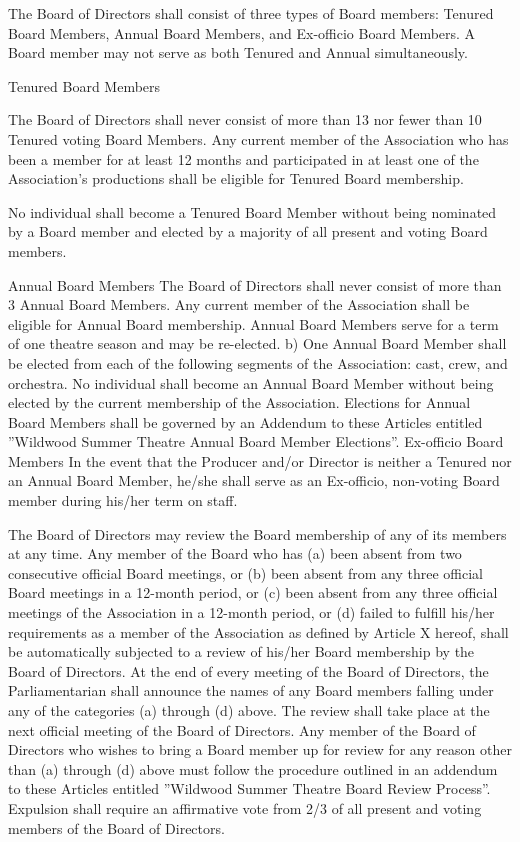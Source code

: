 \documentclass{wst}
\begin{document}
\begin{outline}[enumerate]
\1 The Board of Directors shall consist of three types of Board members:
Tenured Board Members, Annual Board Members, and Ex-officio Board Members.  A
Board member may not serve as both Tenured and Annual simultaneously.

\2 Tenured Board Members

\3 The Board of Directors shall never consist of more than 13 nor fewer than
10 Tenured voting Board Members.  Any current member of the Association who has
been a member for at least 12 months and participated in at least one of the
Association's productions shall be eligible for Tenured Board membership.

\3 No individual shall become a Tenured Board Member without being nominated by
a Board member and elected by a majority of all present and voting Board
members.

\2 Annual Board Members
\3 The Board of Directors shall never consist of more than 3 Annual Board
Members.  Any current member of the Association shall be eligible for Annual
Board membership.  Annual Board Members serve for a term of one theatre season
and may be re-elected.  b)	One Annual Board Member shall be elected from each
of the following segments of the Association: cast, crew, and orchestra.
\3 No individual shall become an Annual Board Member without being elected by
the current membership of the Association.  Elections for Annual Board Members
shall be governed by an Addendum to these Articles entitled ''Wildwood Summer
Theatre Annual Board Member Elections''.
\2 Ex-officio Board Members
\3 In the event that the Producer and/or Director is neither a Tenured nor an
Annual Board Member, he/she shall serve as an Ex-officio, non-voting Board
member during his/her term on staff.

\1 The Board of Directors may review the Board membership of any of its members at any time.
\2 Any member of the Board who has (a) been absent from two consecutive official Board meetings, or (b) been absent from any three official Board meetings in a 12-month period, or (c) been absent from any three official meetings of the Association in a 12-month period, or (d) failed to fulfill his/her requirements as a member of the Association as defined by Article X hereof, shall be automatically subjected to a review of his/her Board membership by the Board of Directors.
\2 At the end of every meeting of the Board of Directors, the Parliamentarian shall announce the names of any Board members falling under any of the categories (a) through (d) above.  The review shall take place at the next official meeting of the Board of Directors.
\2 Any member of the Board of Directors who wishes to bring a Board member up for review for any reason other than (a) through (d) above must follow the procedure outlined in an addendum to these Articles entitled ''Wildwood Summer Theatre Board Review Process''.
\2 Expulsion shall require an affirmative vote from 2/3 of all present and voting members of the Board of Directors.


\end{outline}
\end{document}
